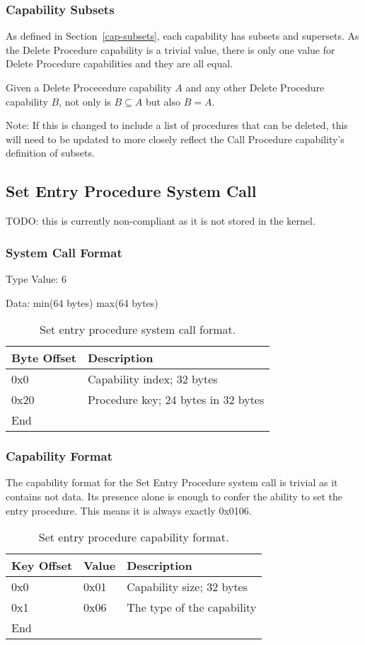 \documentclass[english,a4paper]{article}
\let\oldparagraph\subsubsection
\renewcommand{\subsubsection}[1]{\oldparagraph{#1}\mbox{}}
\begin{document}
\subsubsection{Capability Subsets}
As defined in Section~\ref{cap-subsets}, each capability has subsets and
supersets. As the Delete Procedure capability is a trivial value, there is only
one value for Delete Procedure capabilities and they are all equal.

Given a Delete Procecedure capability $A$ and any other Delete Procedure
capability $B$, not only is $B \subseteq A$ but also $B = A$.

Note: If this is changed to include a list of procedures that can be deleted,
this will need to be updated to more closely reflect the Call Procedure
capability's definition of subsets.

\subsection{Set Entry Procedure System Call}
TODO: this is currently non-compliant as it is not stored in the kernel.

\subsubsection{System Call Format}

Type Value: 6

Data: min(64 bytes) max(64 bytes)

\begin{table}[H]
  \caption{Set entry procedure system call format.}
  \centering{}%
  \begin{tabular}{l|p{}}
    \hline
    Byte Offset & Description\tabularnewline
    \hline
    \hline
    0x0 & Capability index; 32 bytes \tabularnewline
    0x20 & Procedure key; 24 bytes in 32 bytes \tabularnewline
    \hline
    End &  \tabularnewline
    \hline
  \end{tabular}
\end{table}

\subsubsection{Capability Format}
The capability format for the Set Entry Procedure system call is trivial as it
contains not data. Its presence alone is enough to confer the ability to set the
entry procedure. This means it is always exactly 0x0106.

\begin{table}[H]
  \caption{Set entry procedure capability format.}
  \centering{}%
  \begin{tabular}{l|l|p{}}
    \hline
    Key Offset & Value & Description\tabularnewline
    \hline
    \hline
    0x0 & 0x01 & Capability size; 32 bytes \tabularnewline
    0x1 & 0x06 & The type of the capability \tabularnewline
    \hline
    End &  \tabularnewline
    \hline
  \end{tabular}
\end{table}
\end{document}
